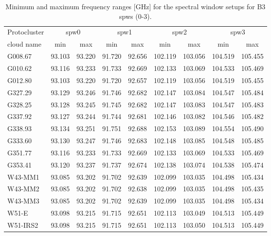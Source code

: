 \documentclass[longauth]{aa} %
\begin{document}
\begin{appendix}
\begin{table}[htbp!]
\centering
\caption{Minimum and maximum frequency ranges [GHz] for the spectral window setups for B3 spws (0-3).}
\label{tab:spwsfreq}

\begin{tabular}{@{\extracolsep{6pt}}lcccccccc@{}}
\hline \noalign {\smallskip}
Protocluster  & \multicolumn{2}{c}{spw0} & \multicolumn{2}{c}{spw1} & \multicolumn{2}{c}{spw2}& \multicolumn{2}{c}{spw3} \\ 
\cline{2-3}\cline{4-5}\cline{6-7}\cline{8-9}
cloud name\tnote{1}  & min & max  & min & max  & min & max  & min & max  \\
\hline \noalign {\smallskip}

G008.67 & 93.103&93.220&91.720&92.656&102.119&103.056&104.519&105.455 \\
G010.62 & 93.116&93.233&91.733&92.669&102.133&103.069&104.533&105.469 \\
G012.80 & 93.103&93.220&91.720&92.657&102.119&103.056&104.519&105.455 \\
G327.29 & 93.129&93.246&91.746&92.682&102.147&103.084&104.547&105.484 \\
G328.25 & 93.128&93.245&91.745&92.682&102.147&103.083&104.547&105.483 \\
G337.92 & 93.127&93.244&91.744&92.681&102.146&103.082&104.546&105.482 \\
G338.93 & 93.134&93.251&91.751&92.688&102.153&103.089&104.554&105.490 \\
G333.60 & 93.130&93.247&91.746&92.683&102.148&103.085&104.548&105.485 \\
G351.77 & 93.116&93.233&91.733&92.669&102.133&103.069&104.533&105.469 \\
G353.41 & 93.120&93.237&91.737&92.674&102.138&103.074&104.538&105.474 \\
W43-MM1 & 93.085&93.202&91.702&92.639&102.099&103.035&104.498&105.434 \\
W43-MM2 & 93.085&93.202&91.702&92.638&102.099&103.035&104.498&105.435 \\
W43-MM3 & 93.085&93.202&91.702&92.639&102.099&103.035&104.498&105.434 \\
W51-E & 93.098&93.215&91.715&92.651&102.113&103.049&104.513&105.449 \\
W51-IRS2 & 93.098&93.215&91.715&92.651&102.113&103.050&104.513&105.449 \\


\end{tabular}
\end{table}
\end{appendix}
\end{document}
